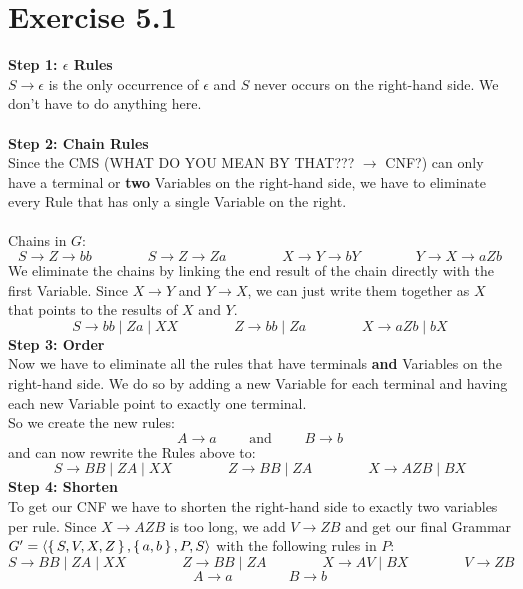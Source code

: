 \documentclass{article} %
\newcommand{\homeworkNumber}{5}
\begin{document}
\section*{Exercise \homeworkNumber.1}
\textbf{Step 1: $\epsilon$ Rules}\\
$S \to \epsilon$ is the only occurrence of $\epsilon$ and $S$ never occurs on the right-hand side. We don't have to do anything here.\\\\
\textbf{Step 2: Chain Rules}\\
Since the CMS (WHAT DO YOU MEAN BY THAT??? $\to$ CNF?) can only have a terminal or \textbf{two} Variables on the right-hand side, we have to eliminate every Rule that has only a single Variable on the right.\\\\
Chains in $G$:
$$S \to Z \to bb \qquad \qquad S \to Z \to Za \qquad \qquad X \to Y \to bY \qquad \qquad Y \to X \to aZb$$
We eliminate the chains by linking the end result of the chain directly with the first Variable. Since $X \to Y$ and $Y \to X$, we can just write them together as $X$ that points to the results of $X$ and $Y$.
$$S \to bb \mid Za \mid XX \qquad \qquad Z \to bb \mid Za \qquad \qquad X \to aZb \mid bX$$
\textbf{Step 3: Order}\\
Now we have to eliminate all the rules that have terminals \textbf{and} Variables on the right-hand side. We do so by adding a new Variable for each terminal and having each new Variable point to exactly one terminal.\\
So we create the new rules:
$$A \to a \qquad \text{ and } \qquad B \to b$$
and can now rewrite the Rules above to:
$$S \to BB \mid ZA \mid XX \qquad \qquad Z \to BB \mid ZA \qquad \qquad X \to AZB \mid BX$$
\textbf{Step 4: Shorten}\\
To get our CNF we have to shorten the right-hand side to exactly two variables per rule. Since $X \to AZB$ is too long, we add $V \to ZB$ and get our final Grammar $G' = \left \langle \set{S, V, X, Z}, \set{a,b}, P, S \right \rangle$ with the following rules in $P$:
$$S \to BB \mid ZA \mid XX \qquad \qquad Z \to BB \mid ZA \qquad \qquad X \to AV \mid BX \qquad \qquad V \to ZB$$
$$A \to a \qquad \qquad B \to b$$

\clearpage
\end{document}
